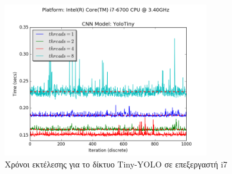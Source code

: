 \begin{figure}[H]
  \centering
  \includegraphics[width=0.8\textwidth]{./images/chapter6/benchmark_yolotiny_i7.png}
  \caption[Χρόνoι εκτέλεσης για το δίκτυο Tiny-YOLO σε επεξεργαστή i7]{Χρόνοι εκτέλεσης για το δίκτυο Tiny-YOLO σε επεξεργαστή i7}
  \label{fig:yolotiny_results_i7}
\end{figure}


